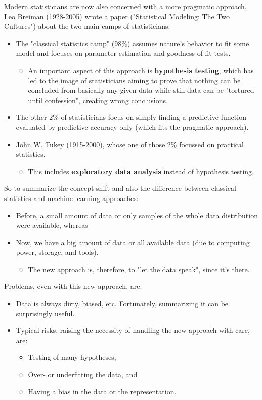 Modern statisticians are now also concerned with a more pragmatic approach. Leo Breiman (1928-2005) wrote a paper ("Statistical Modeling: The Two Cultures") about the two main camps of statisticians:
\begin{itemize}
  \item The "classical statistics camp" ($98\%$) assumes nature's behavior to fit some model and focuses on parameter estimation and goodness-of-fit tests.
  \begin{itemize}
    \item An important aspect of this approach is \textbf{hypothesis testing}, which has led to the image of statisticians aiming to prove that nothing can be concluded from basically any given data while still data can be "tortured until confession", creating wrong conclusions.
  \end{itemize}
  \item The other $2\%$ of statisticians focus on simply finding a predictive function evaluated by predictive accuracy only (which fits the pragmatic approach).
  \item John W. Tukey (1915-2000), whose one of those $2\%$ focussed on practical statistics.
  \begin{itemize}
    \item This includes \textbf{exploratory data analysis} instead of hypothesis testing.
  \end{itemize}
\end{itemize}

So to summarize the concept shift and also the difference between classical statistics and machine learning approaches:
\begin{itemize}
  \item Before, a small amount of data or only samples of the whole data distribution were available, whereas
  \item Now, we have a big amount of data or all available data (due to computing power, storage, and tools).
  \begin{itemize}
    \item The new approach is, therefore, to "let the data speak", since it's there.
  \end{itemize}
\end{itemize}

Problems, even with this new approach, are:
\begin{itemize}
  \item Data is always dirty, biased, etc. Fortunately, summarizing it can be surprisingly useful.
  \item Typical risks, raising the necessity of handling the new approach with care, are:
  \begin{itemize}
    \item Testing of many hypotheses,
    \item Over- or underfitting the data, and
    \item Having a bias in the data or the representation.
  \end{itemize}
\end{itemize}

